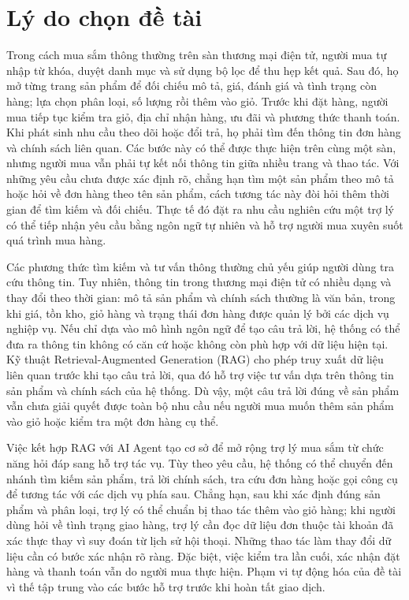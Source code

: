 \documentclass[12pt,a4paper,oneside]{report}
\begin{document}
\section{Lý do chọn đề tài}
Trong cách mua sắm thông thường trên sàn thương mại điện tử, người mua tự nhập từ khóa, duyệt danh mục và sử dụng bộ lọc để thu hẹp kết quả. Sau đó, họ mở từng trang sản phẩm để đối chiếu mô tả, giá, đánh giá và tình trạng còn hàng; lựa chọn phân loại, số lượng rồi thêm vào giỏ. Trước khi đặt hàng, người mua tiếp tục kiểm tra giỏ, địa chỉ nhận hàng, ưu đãi và phương thức thanh toán. Khi phát sinh nhu cầu theo dõi hoặc đổi trả, họ phải tìm đến thông tin đơn hàng và chính sách liên quan. Các bước này có thể được thực hiện trên cùng một sàn, nhưng người mua vẫn phải tự kết nối thông tin giữa nhiều trang và thao tác. Với những yêu cầu chưa được xác định rõ, chẳng hạn tìm một sản phẩm theo mô tả hoặc hỏi về đơn hàng theo tên sản phẩm, cách tương tác này đòi hỏi thêm thời gian để tìm kiếm và đối chiếu. Thực tế đó đặt ra nhu cầu nghiên cứu một trợ lý có thể tiếp nhận yêu cầu bằng ngôn ngữ tự nhiên và hỗ trợ người mua xuyên suốt quá trình mua hàng.

Các phương thức tìm kiếm và tư vấn thông thường chủ yếu giúp người dùng tra cứu thông tin. Tuy nhiên, thông tin trong thương mại điện tử có nhiều dạng và thay đổi theo thời gian: mô tả sản phẩm và chính sách thường là văn bản, trong khi giá, tồn kho, giỏ hàng và trạng thái đơn hàng được quản lý bởi các dịch vụ nghiệp vụ. Nếu chỉ dựa vào mô hình ngôn ngữ để tạo câu trả lời, hệ thống có thể đưa ra thông tin không có căn cứ hoặc không còn phù hợp với dữ liệu hiện tại. Kỹ thuật Retrieval-Augmented Generation (RAG) cho phép truy xuất dữ liệu liên quan trước khi tạo câu trả lời, qua đó hỗ trợ việc tư vấn dựa trên thông tin sản phẩm và chính sách của hệ thống. Dù vậy, một câu trả lời đúng về sản phẩm vẫn chưa giải quyết được toàn bộ nhu cầu nếu người mua muốn thêm sản phẩm vào giỏ hoặc kiểm tra một đơn hàng cụ thể.

Việc kết hợp RAG với AI Agent tạo cơ sở để mở rộng trợ lý mua sắm từ chức năng hỏi đáp sang hỗ trợ tác vụ. Tùy theo yêu cầu, hệ thống có thể chuyển đến nhánh tìm kiếm sản phẩm, trả lời chính sách, tra cứu đơn hàng hoặc gọi công cụ để tương tác với các dịch vụ phía sau. Chẳng hạn, sau khi xác định đúng sản phẩm và phân loại, trợ lý có thể chuẩn bị thao tác thêm vào giỏ hàng; khi người dùng hỏi về tình trạng giao hàng, trợ lý cần đọc dữ liệu đơn thuộc tài khoản đã xác thực thay vì suy đoán từ lịch sử hội thoại. Những thao tác làm thay đổi dữ liệu cần có bước xác nhận rõ ràng. Đặc biệt, việc kiểm tra lần cuối, xác nhận đặt hàng và thanh toán vẫn do người mua thực hiện. Phạm vi tự động hóa của đề tài vì thế tập trung vào các bước hỗ trợ trước khi hoàn tất giao dịch.
\end{document}
